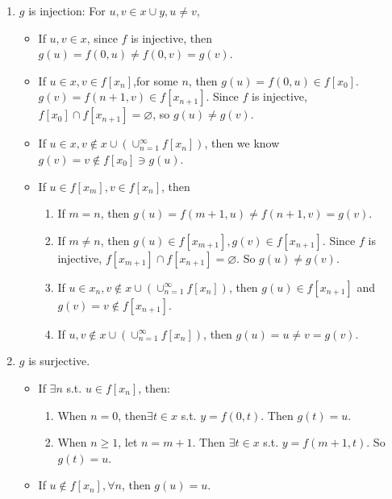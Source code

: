 \documentclass{ctexart}
\begin{document}
\begin{solution}
\begin{enumerate}
       \begin{enumerate}
        \item $g$ is injection:  For $u,v\in x\cup y,u\neq v$,  
        \begin{itemize}
         \item If $u,v\in x$, since $f$ is injective, then $g(u)=f(0,u)\neq f(0,v)=g(v)$. 
         \item If $u\in x,v\in f[x_n]$,for some $n$, then $g(u)=f(0,u)\in f[x_0]$. $g(v)=f(n+1,v)\in f[x_{n+1}]$. Since $f$ is injective, $f[x_0]\cap f[x_{n+1}]=\varnothing$, so $g(u)\neq g(v)$. 
         \item If $u\in x,v\notin x\cup (\cup_{n=1}^{\infty} f[x_n])$, then we know $g(v)=v\notin f[x_0]\ni g(u)$. 
         \item If $u\in f[x_m],v\in f[x_n]$, then 
          \begin{enumerate}
            \item If $m=n$, then $g(u)=f(m+1,u)\neq f(n+1,v)=g(v)$. 
            \item If $m\neq n$, then $g(u)\in f[x_{m+1}],g(v)\in f[x_{n+1}]. $ Since $f$ is injective, $f[x_{m+1}]\cap f[x_{n+1}]=\varnothing$. So $g(u)\neq g(v)$. 
            \item If $u\in x_n,v\notin x\cup (\cup_{n=1}^{\infty} f[x_n])$, then $g(u)\in f[x_{n+1}]$ and $g(v)=v\notin f[x_{n+1}]$. 
            \item If $u,v\notin x\cup (\cup_{n=1}^{\infty} f[x_n])$, then $g(u)=u\neq v=g(v)$. 
        \end{enumerate}
        \end{itemize}
        \item $g$ is surjective. 
        \begin{itemize}
         \item If $\exists n $ s.t. $u\in f[x_n]$, then: 
         \begin{enumerate}
            \item When $n=0$, then$\exists t\in x$ s.t. $y=f(0,t)$. Then $g(t)=u$. 
            \item When $n\geq 1$, let $n=m+1$. Then $\exists t\in x$ s.t. $y=f(m+1,t)$. So $g(t)=u$. 
        \end{enumerate}
         \item If $u\notin f[x_n],\forall n$, then $g(u)=u$. 
        \end{itemize}
       \end{enumerate}
    \end{enumerate}
\end{solution}
\end{document}
